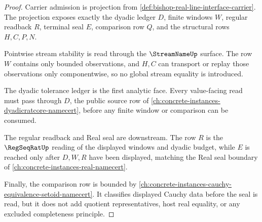 \begin{proof}
Carrier admission is projection from \autoref{def:bishop-real-line-interface-carrier}. The projection exposes exactly the dyadic ledger $D$, finite windows $W$, regular readback $R$, terminal seal $E$, comparison row $Q$, and the structural rows $H,C,P,N$.

Pointwise stream stability is read through the $\StreamNameUp$ surface. The row $W$ contains only bounded observations, and $H,C$ can transport or replay those observations only componentwise, so no global stream equality is introduced.

The dyadic tolerance ledger is the first analytic face. Every value-facing read must pass through $D$, the public source row of \autoref{ch:concrete-instances-dyadicratcore-namecert}, before any finite window or comparison can be consumed.

The regular readback and Real seal are downstream. The row $R$ is the $\RegSeqRatUp$ reading of the displayed windows and dyadic budget, while $E$ is reached only after $D,W,R$ have been displayed, matching the Real seal boundary of \autoref{ch:concrete-instances-real-namecert}.

Finally, the comparison row is bounded by \autoref{ch:concrete-instances-cauchy-equivalence-setoid-namecert}. It classifies displayed Cauchy data before the seal is read, but it does not add quotient representatives, host real equality, or any excluded completeness principle.
\end{proof}

